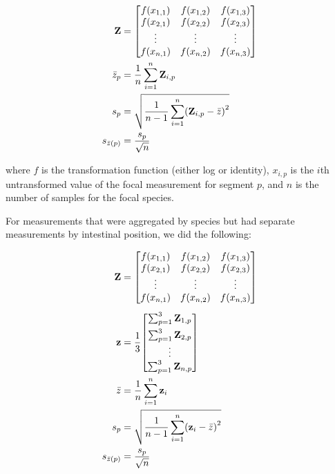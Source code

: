 \documentclass[12pt,]{article}
\let\originalleft\left
\let\originalright\right
\renewcommand{\left}{\mathopen{}\mathclose\bgroup\originalleft}
\renewcommand{\right}{\aftergroup\egroup\originalright}
\begin{document}
\begin{equation}
\label{eq:aggr-sp-pos}
\begin{split}
    \mathbf{Z} &= 
\begin{bmatrix}
    f\left( x_{1,1} \right) & f\left( x_{1,2} \right) & f\left( x_{1,3} \right) \\
    f\left( x_{2,1} \right) & f\left( x_{2,2} \right) & f\left( x_{2,3} \right) \\
    \vdots & \vdots & \vdots \\
    f\left( x_{n,1} \right) & f\left( x_{n,2} \right) & f\left( x_{n,3} \right)
\end{bmatrix} \\
    \bar{z}_p &= \frac{1}{n} \sum_{i=1}^{n} \mathbf{Z}_{i,p} \\
    s_p &= \sqrt{ \frac{1}{n-1} \sum_{i=1}^{n}\left( \mathbf{Z}_{i,p} - \bar{z} \right)^2 } \\
    s_{\bar{z}(p)} &= \frac{ s_p }{ \sqrt{n} }
\end{split}
\end{equation}

where \(f\) is the transformation function (either log or identity),
\(x_{i,p}\) is the \(i\)th untransformed value of the focal measurement for segment \(p\),
and \(n\) is the number of samples for the focal species.

For measurements that were aggregated by species but had separate measurements by
intestinal position, we did the following:

\begin{equation}
\label{eq:aggr-sp}
\begin{split}
    \mathbf{Z} &= 
\begin{bmatrix}
    f\left( x_{1,1} \right) & f\left( x_{1,2} \right) & f\left( x_{1,3} \right) \\
    f\left( x_{2,1} \right) & f\left( x_{2,2} \right) & f\left( x_{2,3} \right) \\
    \vdots & \vdots & \vdots \\
    f\left( x_{n,1} \right) & f\left( x_{n,2} \right) & f\left( x_{n,3} \right)
\end{bmatrix} \\[1ex]
    \mathbf{z} &= \frac{1}{3} \begin{bmatrix}
    \sum_{p=1}^{3} \mathbf{Z}_{1,p} \\[1ex]
    \sum_{p=1}^{3} \mathbf{Z}_{2,p} \\
    \vdots \\
    \sum_{p=1}^{3} \mathbf{Z}_{n,p}
\end{bmatrix} \\
    \bar{z} &= \frac{1}{n} \sum_{i=1}^{n} \mathbf{z}_{i} \\
    s_p &= \sqrt{ \frac{1}{n-1} \sum_{i=1}^{n}\left( \mathbf{z}_{i} - \bar{z} \right)^2 } \\
    s_{\bar{z}(p)} &= \frac{ s_p }{ \sqrt{n} }
\end{split}
\end{equation}
\end{document}
